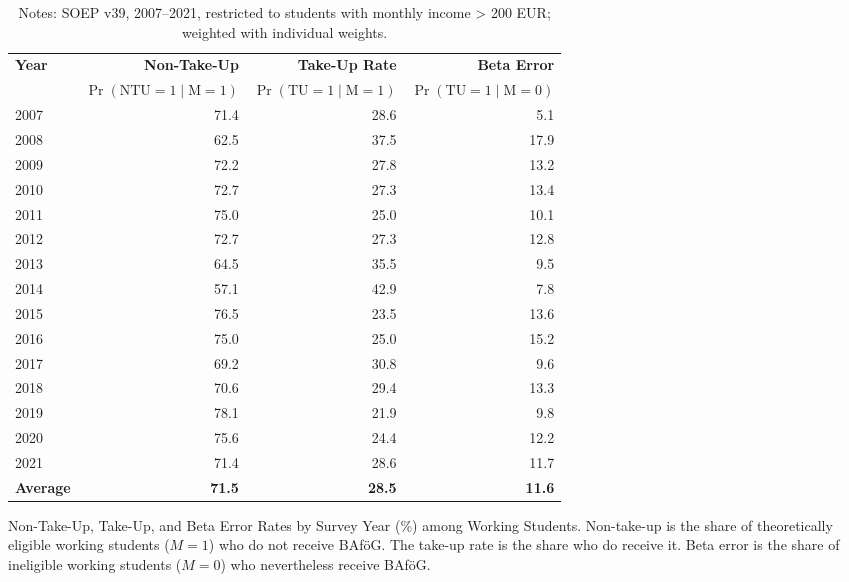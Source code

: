 \begin{table}[htbp]
\centering
\begin{tabular}{l@{\hspace{2em}}r@{\hspace{2em}}r@{\hspace{2em}}r}
\toprule
\textbf{Year} & \textbf{Non-Take-Up} & \textbf{Take-Up Rate} & \textbf{Beta Error} \\
              & \(\Pr(\text{NTU} = 1 \mid \text{M} = 1)\) & \(\Pr(\text{TU} = 1 \mid \text{M} = 1)\) & \(\Pr(\text{TU} = 1 \mid \text{M} = 0)\) \\
\midrule
2007 & 71.4 & 28.6 & 5.1 \\
2008 & 62.5 & 37.5 & 17.9 \\
2009 & 72.2 & 27.8 & 13.2 \\
2010 & 72.7 & 27.3 & 13.4 \\
2011 & 75.0 & 25.0 & 10.1 \\
2012 & 72.7 & 27.3 & 12.8 \\
2013 & 64.5 & 35.5 & 9.5 \\
2014 & 57.1 & 42.9 & 7.8 \\
2015 & 76.5 & 23.5 & 13.6 \\
2016 & 75.0 & 25.0 & 15.2 \\
2017 & 69.2 & 30.8 & 9.6 \\
2018 & 70.6 & 29.4 & 13.3 \\
2019 & 78.1 & 21.9 & 9.8 \\
2020 & 75.6 & 24.4 & 12.2 \\
2021 & 71.4 & 28.6 & 11.7 \\
\midrule
\textbf{Average} & \textbf{71.5} & \textbf{28.5} & \textbf{11.6} \\
\bottomrule
\end{tabular}
\caption{Non-Take-Up, Take-Up, and Beta Error Rates by Survey Year (\%) among Working Students. Non-take-up is the share of theoretically eligible working students (\(M=1\)) who do not receive BAföG. The take-up rate is the share who do receive it. Beta error is the share of ineligible working students (\(M=0\)) who nevertheless receive BAföG.}
\caption*{\small{Notes: SOEP v39, 2007--2021, restricted to students with monthly income > 200 EUR; weighted with individual weights.}}
\label{table:ntu-working-students}
\end{table}
